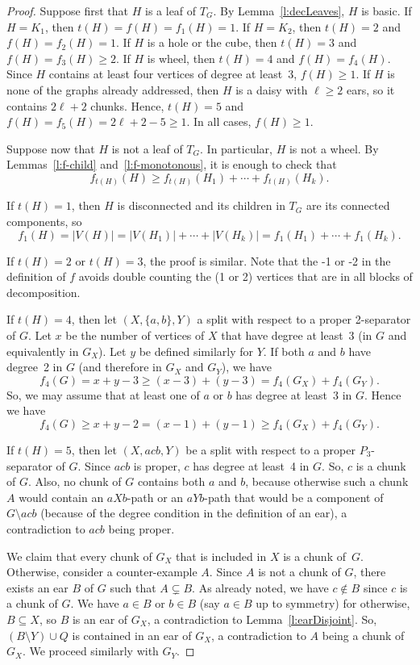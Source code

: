 \documentclass[11pt]{article}
\newcommand{\sm}{\setminus}
\begin{document}
\begin{proof}
  Suppose first that $H$ is a leaf of $T_G$. By Lemma~\ref{l:decLeaves}, $H$ is basic. If $H=K_1$, then $t(H) = f(H) = f_1(H) = 1$.  If $H=K_2$, then $t(H)=2$ and $f(H) = f_2(H) = 1$. If $H$ is a hole or the cube, then $t(H) = 3$ and $f(H) = f_3(H) \geq 2$.  If $H$ is wheel, then $t(H) = 4$ and $f(H) = f_4(H)$. Since $H$ contains at least four vertices of degree at least~3, $f(H) \geq 1$. If $H$ is none of the graphs already addressed, then $H$ is a daisy with $\ell\geq 2$ ears, so it contains $2\ell + 2$ chunks.  Hence, $t(H) = 5$ and $f(H) = f_5(H) = 2\ell + 2 -5 \geq 1$.  In all cases, $f(H) \geq 1$. 
  
  Suppose now that $H$ is not a leaf of $T_G$.  In particular, $H$ is not a wheel. By Lemmas~\ref{l:f-child} and~\ref{l:f-monotonous}, it is enough to check that $$f_{t(H)}(H) \geq f_{t(H)}(H_1) + \cdots + f_{t(H)}(H_k).$$ 
  
  If $t(H)=1$, then $H$ is disconnected and its children in $T_G$ are its connected components, so $$f_1(H) = |V(H)| = |V(H_1)| + \cdots + |V(H_k)| = f_1(H_1) + \cdots + f_1(H_k).$$
  
  If $t(H)=2$ or $t(H)=3$, the proof is similar. Note that the -1 or -2 in the definition of $f$ avoids double counting the (1 or 2) vertices that are in all blocks of decomposition. 
   
  If $t(H)=4$, then let $(X, \{a, b\}, Y)$ a split with respect to a proper 2-separator of $G$.  Let $x$ be the number of vertices of $X$ that have degree at least~3 (in $G$ and equivalently in $G_X$). Let $y$ be defined similarly for $Y$. 
  If both $a$ and $b$ have degree~2 in $G$ (and therefore in $G_X$ and $G_Y$), we have $$f_4(G) = x+y -3 \geq (x-3) + (y-3) = f_4(G_X) + f_4(G_Y).$$ So, we may assume that at least one of $a$ or $b$ has degree at least~3 in $G$. 
  Hence we have $$f_4(G) \geq x+y-2 = (x-1) + (y-1) \geq f_4(G_X) + f_4(G_Y).$$
  
  If $t(H)=5$, then let $(X, acb, Y)$ be a split with respect to a proper $P_3$-separator of $G$.  Since $acb$ is proper, $c$ has degree at least~4 in $G$. So, $c$ is a chunk of $G$. Also, no chunk of $G$ contains both $a$ and $b$, because otherwise such a chunk $A$ would contain an $aXb$-path or an $aYb$-path  that would be a component of $G \sm acb$ (because of the degree condition in the definition of an ear), a contradiction to $acb$ being proper. 
  
  We claim that every chunk of $G_X$ that is included in $X$ is a chunk of~$G$.  Otherwise, consider a  counter-example $A$. Since $A$ is not a chunk of $G$, there exists an ear $B$ of $G$ such that $A \subsetneq B$. As already noted, we have $c\notin B$ since $c$ is a chunk of $G$. We have $a\in B$ or $b\in B$ (say $a\in B$ up to symmetry) for otherwise, $B\subseteq X$, so $B$ is an ear of $G_X$, a contradiction to Lemma~\ref{l:earDisjoint}.  So, $(B\sm Y) \cup Q$ is contained in an ear of $G_X$, a contradiction to $A$ being a chunk of $G_X$.  We proceed similarly with $G_Y$. 
  

\end{proof}
\end{document}
